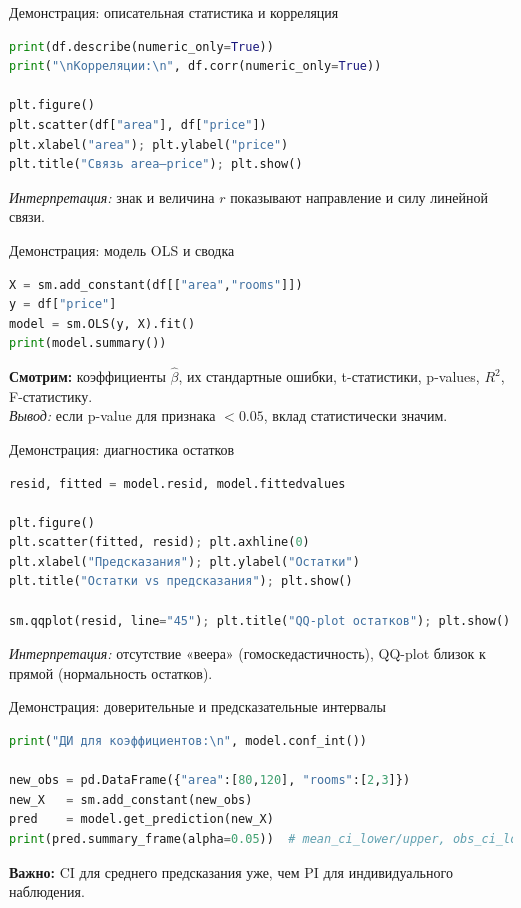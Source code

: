 \documentclass{beamer}
\begin{document}
\begin{frame}[fragile]{Демонстрация: описательная статистика и корреляция}
\begin{lstlisting}[language=Python]
print(df.describe(numeric_only=True))
print("\nКорреляции:\n", df.corr(numeric_only=True))

plt.figure()
plt.scatter(df["area"], df["price"])
plt.xlabel("area"); plt.ylabel("price")
plt.title("Связь area–price"); plt.show()
\end{lstlisting}
\textit{Интерпретация:} знак и величина $r$ показывают направление и силу линейной связи.
\end{frame}

\begin{frame}[fragile]{Демонстрация: модель OLS и сводка}
\begin{lstlisting}[language=Python]
X = sm.add_constant(df[["area","rooms"]])
y = df["price"]
model = sm.OLS(y, X).fit()
print(model.summary())
\end{lstlisting}
\textbf{Смотрим:} коэффициенты $\hat\beta$, их стандартные ошибки, t-статистики, p-values, $R^2$, F-статистику.\\
\textit{Вывод:} если p-value для признака $<0.05$, вклад статистически значим.
\end{frame}

\begin{frame}[fragile]{Демонстрация: диагностика остатков}
\begin{lstlisting}[language=Python]
resid, fitted = model.resid, model.fittedvalues

plt.figure()
plt.scatter(fitted, resid); plt.axhline(0)
plt.xlabel("Предсказания"); plt.ylabel("Остатки")
plt.title("Остатки vs предсказания"); plt.show()

sm.qqplot(resid, line="45"); plt.title("QQ-plot остатков"); plt.show()
\end{lstlisting}
\textit{Интерпретация:} отсутствие «веера» (гомоскедастичность), QQ-plot близок к прямой (нормальность остатков).
\end{frame}

\begin{frame}[fragile]{Демонстрация: доверительные и предсказательные интервалы}
\begin{lstlisting}[language=Python]
print("ДИ для коэффициентов:\n", model.conf_int())

new_obs = pd.DataFrame({"area":[80,120], "rooms":[2,3]})
new_X   = sm.add_constant(new_obs)
pred    = model.get_prediction(new_X)
print(pred.summary_frame(alpha=0.05))  # mean_ci_lower/upper, obs_ci_lower/upper
\end{lstlisting}
\textbf{Важно:} CI для среднего предсказания уже, чем PI для индивидуального наблюдения.
\end{frame}
\end{document}
